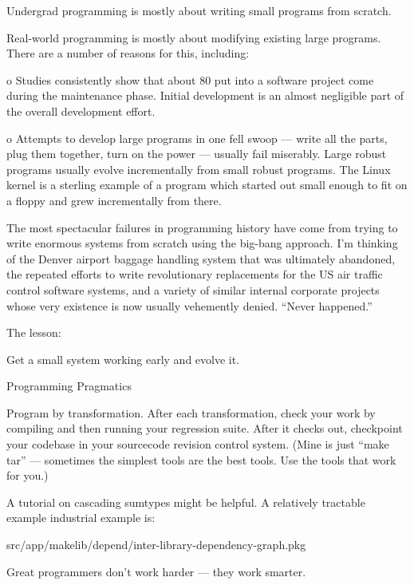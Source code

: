     Undergrad programming is mostly about writing small programs from scratch.

    Real-world programming is mostly about modifying existing large programs.
    There are a number of reasons for this, including:

     o Studies consistently show that about 80%
       put into a software project come during the maintenance phase.
       Initial development is an almost negligible part of the overall 
       development effort.

     o Attempts to develop large programs in one fell swoop  --- write all 
       the parts, plug them together, turn on the power  --- usually fail 
       miserably.  Large robust programs usually evolve incrementally from 
       small robust programs.  The Linux kernel is a sterling example of 
       a program which started out small enough to fit on a floppy and 
       grew incrementally from there.

     The most spectacular failures in programming history have come from 
     trying to write enormous systems from scratch using the big-bang 
     approach.  I'm thinking of the Denver airport baggage handling system 
     that was ultimately abandoned, the repeated efforts to write revolutionary 
     replacements for the US air traffic control software systems, and a 
     variety of similar internal corporate projects whose very existence is 
     now usually vehemently denied.  ``Never happened.''

     The lesson:

         Get a small system working early and evolve it.




Programming Pragmatics 

Program by transformation.  After each transformation, check your work 
by compiling and then running your regression suite.  After it checks 
out, checkpoint your codebase in your sourcecode revision control system. 
(Mine is just ``make tar''  --- sometimes the simplest tools are the best tools.
Use the tools that work for you.)



A tutorial on cascading sumtypes might be helpful.  A relatively tractable 
example industrial example is:

    src/app/makelib/depend/inter-library-dependency-graph.pkg 



Great programmers don't work harder  --- they work smarter.

